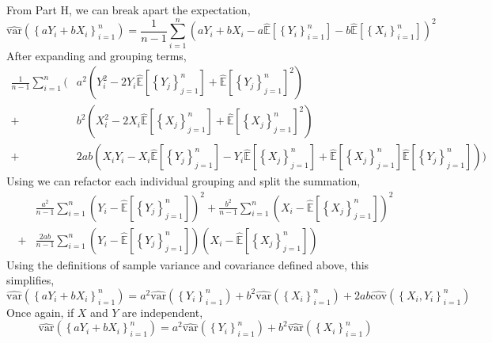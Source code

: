\documentclass[12pt,twoside]{article}
\begin{document}
\begin{problems}
\begin{problemparts}
From Part H, we can break apart the expectation,
$$ \hat{\mathrm{var}}\left(\left\{aY_i + bX_i\right\}_{i = 1}^n\right) = \frac{1}
{n - 1} \sum_{i = 1}^n  \left(aY_i + bX_i - a \hat{\mathbb{E}}\left[\left\{Y_i
\right\}_{i = 1}^n \right] - b \hat{\mathbb{E}}\left[\left\{X_i\right\}_{i = 1}^n 
\right] \right)^2 $$
After expanding and grouping terms,
\begin{align*}
    \frac{1} {n - 1} \sum_{i = 1}^n  \Bigg( &a^2\left(Y_i^2 - 2 Y_i \hat{\mathbb{E}}
    \left[\left\{ Y_j \right\}_{j = 1}^n\right] + \hat{\mathbb{E}}\left[\left\{Y_j
    \right\}_{j = 1}^n \right]^2 \right) \\
    + &b^2 \left(X_i^2 - 2 X_i \hat{\mathbb{E}}\left[\left\{ X_j\right\}_{j = 1}^n\right] +
    \hat{\mathbb{E}}\left[\left\{X_j\right\}_{j = 1}^n  \right]^2\right) \\
    + &2ab \left( X_i Y_i - X_i \hat{\mathbb{E}}\left[\left\{Y_j\right\}_{j = 1}^n  \right] - Y_i
    \hat{\mathbb{E}}\left[\left\{X_j\right\}_{j = 1}^n \right] +
    \hat{\mathbb{E}}\left[\left\{X_j\right\}_{j = 1}^n 
    \right]\hat{\mathbb{E}}\left[\left\{Y_j\right\}_{j = 1}^n  \right] \right) \Bigg)
\end{align*}
Using we can refactor each individual grouping and split the summation,
\begin{align*}
    &\frac{a^2} {n - 1} \sum_{i = 1}^n  \left(Y_i - \hat{\mathbb{E}}
    \left[\left\{ Y_j \right\}_{j = 1}^n\right] \right)^2 
    + \frac{b^2} {n - 1} \sum_{i = 1}^n \left(X_i - \hat{\mathbb{E}}\left[\left\{ 
    X_j\right\}_{j = 1}^n\right] \right)^2 \\
    + &\frac{2ab} {n - 1} \sum_{i = 1}^n \left( Y_i - \hat{\mathbb{E}}\left[\left\{
    Y_j\right\}_{j = 1}^n  \right]\right)
    \left(X_i - \hat{\mathbb{E}}\left[\left\{X_j\right\}_{j = 1}^n \right] \right) 
\end{align*}
Using the definitions of sample variance and covariance defined above, this simplifies,
$$ \boxed{\hat{\mathrm{var}}\left(\left\{aY_i + bX_i\right\}_{i = 1}^n\right) = a^2
\hat{\mathrm{var}}(\left\{Y_i\right\}_{i = 1}^n) + b^2 \hat{\mathrm{var}}(\left\{X_i
\right\}_{i = 1}^n) + 2ab \hat{\mathrm{cov}}(\left\{X_i, Y_i\right\}_{i = 1}^n)} $$
Once again, if $X$ and $Y$ are independent,
$$ \hat{\mathrm{var}}\left(\left\{aY_i + bX_i\right\}_{i = 1}^n\right) = a^2
\hat{\mathrm{var}}(\left\{Y_i\right\}_{i = 1}^n) + b^2 \hat{\mathrm{var}}(\left\{X_i
\right\}_{i = 1}^n) $$

\problempart %


\end{problemparts}
\end{problems}
\end{document}
